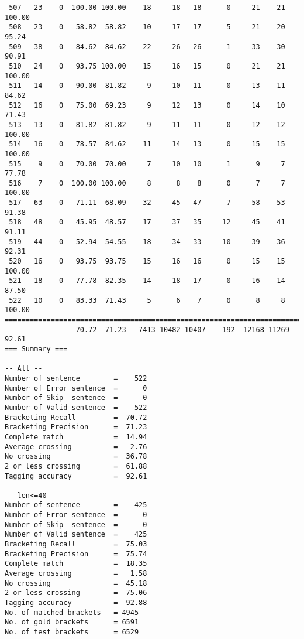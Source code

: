 \begin{verbatim}
 507   23    0  100.00 100.00    18     18   18      0     21    21   100.00
 508   23    0   58.82  58.82    10     17   17      5     21    20    95.24
 509   38    0   84.62  84.62    22     26   26      1     33    30    90.91
 510   24    0   93.75 100.00    15     16   15      0     21    21   100.00
 511   14    0   90.00  81.82     9     10   11      0     13    11    84.62
 512   16    0   75.00  69.23     9     12   13      0     14    10    71.43
 513   13    0   81.82  81.82     9     11   11      0     12    12   100.00
 514   16    0   78.57  84.62    11     14   13      0     15    15   100.00
 515    9    0   70.00  70.00     7     10   10      1      9     7    77.78
 516    7    0  100.00 100.00     8      8    8      0      7     7   100.00
 517   63    0   71.11  68.09    32     45   47      7     58    53    91.38
 518   48    0   45.95  48.57    17     37   35     12     45    41    91.11
 519   44    0   52.94  54.55    18     34   33     10     39    36    92.31
 520   16    0   93.75  93.75    15     16   16      0     15    15   100.00
 521   18    0   77.78  82.35    14     18   17      0     16    14    87.50
 522   10    0   83.33  71.43     5      6    7      0      8     8   100.00
============================================================================
                 70.72  71.23   7413 10482 10407    192  12168 11269    92.61
=== Summary ===

-- All --
Number of sentence        =    522
Number of Error sentence  =      0
Number of Skip  sentence  =      0
Number of Valid sentence  =    522
Bracketing Recall         =  70.72
Bracketing Precision      =  71.23
Complete match            =  14.94
Average crossing          =   2.76
No crossing               =  36.78
2 or less crossing        =  61.88
Tagging accuracy          =  92.61

-- len<=40 --
Number of sentence        =    425
Number of Error sentence  =      0
Number of Skip  sentence  =      0
Number of Valid sentence  =    425
Bracketing Recall         =  75.03
Bracketing Precision      =  75.74
Complete match            =  18.35
Average crossing          =   1.58
No crossing               =  45.18
2 or less crossing        =  75.06
Tagging accuracy          =  92.88
No. of matched brackets   = 4945
No. of gold brackets      = 6591
No. of test brackets      = 6529

\end{verbatim}

\normalsize

